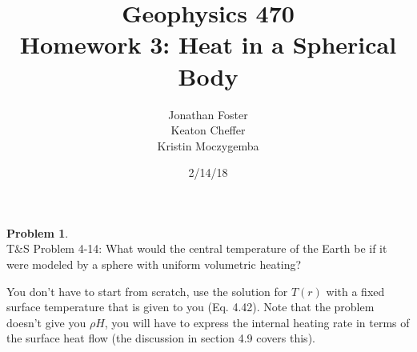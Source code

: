 \documentclass[titlepage, 11pt]{article}
\author{Jonathan Foster \\ Keaton Cheffer \\ Kristin Moczygemba}
\title{Geophysics 470 \\ Homework 3: Heat in a Spherical Body}
\date{2/14/18}
\theoremstyle{definition}
\newtheorem{problem}{Problem}
\begin{document}
\maketitle

\begin{problem}\ \\
T\&S Problem 4-14: What would the central temperature of the Earth be if it were modeled by a sphere  with uniform volumetric heating?\vspace{\baselineskip}

\noindent
You don't have to start from scratch, use the solution for $T(r)$ with a fixed surface temperature that is given to you (Eq. 4.42).
\noindent
Note that the problem doesn't give you $\rho H$, you will have to express the internal heating rate in terms of the surface heat flow (the discussion in section 4.9 covers this).
\end{problem}
\end{document}
